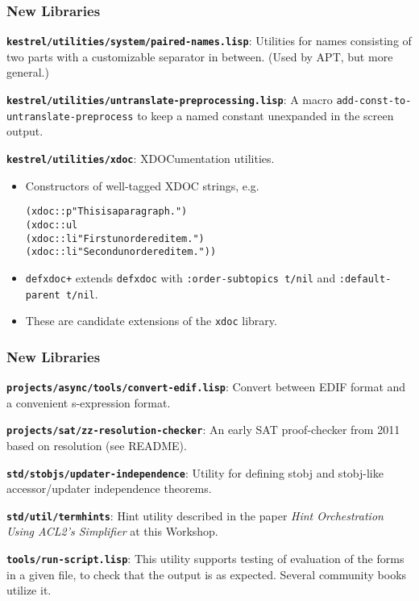 \documentclass{beamer}
\newcommand{\code}[1]{\texttt{#1}}
\newenvironment{codeblock}{\begin{alltt}}{\end{alltt}}
\newcommand{\bookpath}[1]{\textbf{\code{#1}}}
\newcommand{\newlibtitle}{\frametitle{New Libraries}}
\newcommand{\separation}{\vspace*{1ex}}
\begin{document}
\begin{frame}[fragile]

\newlibtitle

\bookpath{kestrel/utilities/system/paired-names.lisp}:
Utilities for names consisting of
two parts with a customizable separator in between.
(Used by APT, but more general.)

\separation

\bookpath{kestrel/utilities/untranslate-preprocessing.lisp}:
A macro \code{add-const-to-untranslate-preprocess}
to keep a named constant unexpanded in the screen output.

\separation

\bookpath{kestrel/utilities/xdoc}:
XDOCumentation utilities.
\begin{itemize}
\item
Constructors of well-tagged XDOC strings, e.g.
\begin{codeblock}
(xdoc::p "This is a paragraph.")
(xdoc::ul
  (xdoc::li "First unordered item.")
  (xdoc::li "Second unordered item."))
\end{codeblock}
\item
\code{defxdoc+} extends \code{defxdoc} with
\code{:order-subtopics t/nil} and \code{:default-parent t/nil}.
\item
These are candidate extensions of the \code{xdoc} library.
\end{itemize}

\end{frame}


\begin{frame}

\newlibtitle

\bookpath{projects/async/tools/convert-edif.lisp}:
Convert between EDIF format and a convenient s-expression format.

\separation

\bookpath{projects/sat/zz-resolution-checker}:
An early SAT proof-checker from 2011 based on resolution (see README).

\separation

\bookpath{std/stobjs/updater-independence}:
Utility for defining stobj and stobj-like accessor/updater
independence theorems.

\separation

\bookpath{std/util/termhints}:
Hint utility described in the paper
\textit{Hint Orchestration Using ACL2's Simplifier}
at this Workshop.

\separation

\bookpath{tools/run-script.lisp}:
This utility supports testing of evaluation of the forms
in a given file, to check that the output is as expected.
Several community books utilize it.

\end{frame}
\end{document}
